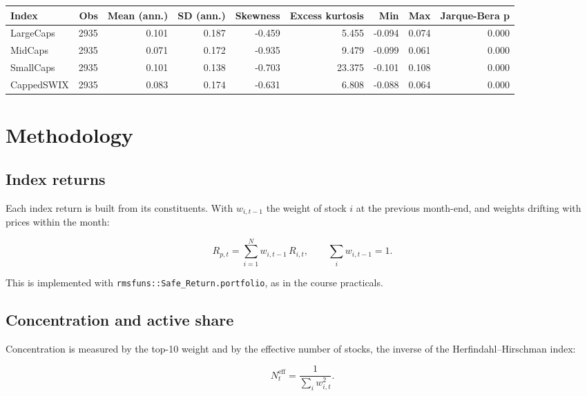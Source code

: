 \documentclass[11pt,preprint]{elsarticle}
\let\origtable\table
\let\endorigtable\endtable
\renewenvironment{table}[1][2] {
    \expandafter\origtable\expandafter[H]
} {
    \endorigtable
}
\numberwithin{equation}{section}
\numberwithin{figure}{section}
\numberwithin{table}{section}
\begin{document}
\begin{table}[!htbp]
\centering
\caption{Descriptive statistics of daily index returns (Jan 2015 to Sep 2026)} 
\label{tab:desc}
\begingroup\footnotesize
\begin{tabular}{lrrrrrrrr}
  \hline
Index & Obs & Mean (ann.) & SD (ann.) & Skewness & Excess kurtosis & Min & Max & Jarque-Bera p \\ 
  \hline
LargeCaps & 2935 & 0.101 & 0.187 & -0.459 & 5.455 & -0.094 & 0.074 & 0.000 \\ 
  MidCaps & 2935 & 0.071 & 0.172 & -0.935 & 9.479 & -0.099 & 0.061 & 0.000 \\ 
  SmallCaps & 2935 & 0.101 & 0.138 & -0.703 & 23.375 & -0.101 & 0.108 & 0.000 \\ 
  CappedSWIX & 2935 & 0.083 & 0.174 & -0.631 & 6.808 & -0.088 & 0.064 & 0.000 \\ 
   \hline
\end{tabular}
\endgroup
\end{table}

\section{\texorpdfstring{Methodology
\label{Method}}{Methodology }}\label{methodology}

\subsection{Index returns}\label{index-returns}

Each index return is built from its constituents. With \(w_{i,t-1}\) the
weight of stock \(i\) at the previous month-end, and weights drifting
with prices within the month:

\[
R_{p,t} = \sum_{i=1}^{N} w_{i,t-1} \, R_{i,t}, \qquad \sum_i w_{i,t-1} = 1.
\]

This is implemented with \texttt{rmsfuns::Safe\_Return.portfolio}, as in
the course practicals.

\subsection{Concentration and active
share}\label{concentration-and-active-share}

Concentration is measured by the top-10 weight and by the effective
number of stocks, the inverse of the Herfindahl--Hirschman index:

\[
N^{\text{eff}}_t = \frac{1}{\sum_i w_{i,t}^2}.
\]
\end{document}
